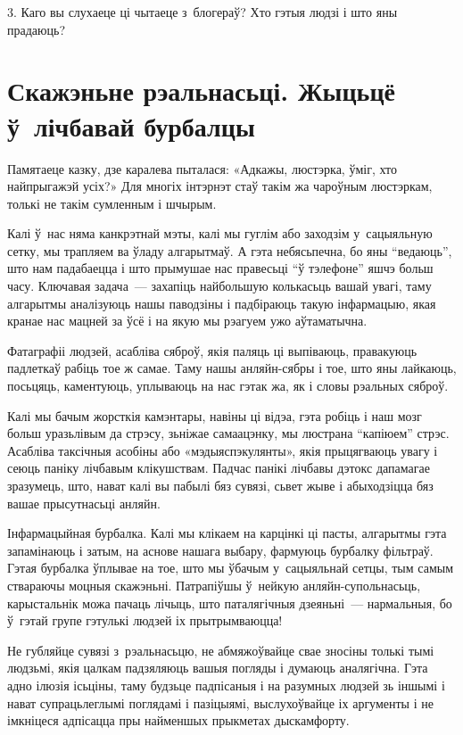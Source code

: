 3. Каго вы слухаеце ці чытаеце з~блогераў? Хто гэтыя людзі і што яны прадаюць?


\section{Скажэньне рэальнасьці. Жыцьцё ў~лічбавай бурбалцы}

Памятаеце казку, дзе каралева пыталася: «Адкажы, люстэрка, ўміг, хто найпрыгажэй усіх?» Для многіх інтэрнэт стаў такім жа чароўным люстэркам, толькі не такім сумленным і шчырым.

Калі ў~нас няма канкрэтнай мэты, калі мы гуглім або заходзім у~сацыяльную сетку, мы трапляем ва ўладу алгарытмаў. А гэта небясьпечна, бо яны ``ведаюць'', што нам падабаецца і што прымушае нас правесьці ``ў тэлефоне'' яшчэ больш часу. Ключавая задача~--- захапіць найбольшую колькасьць вашай увагі, таму алгарытмы аналізуюць нашы паводзіны і падбіраюць такую інфармацыю, якая кранае нас мацней за ўсё і на якую мы рэагуем ужо аўтаматычна.

Фатаграфіі людзей, асабліва сяброў, якія паляць ці выпіваюць, правакуюць падлеткаў рабіць тое ж самае. Таму нашы анляйн-сябры і тое, што яны лайкаюць, посьцяць, каментуюць, уплываюць на нас гэтак жа, як і словы рэальных сяброў.

Калі мы бачым жорсткія камэнтары, навіны ці відэа, гэта робіць і наш мозг больш уразьлівым да стрэсу, зьніжае самаацэнку, мы люстрана ``капіюем'' стрэс. Асабліва таксічныя асобіны або «мэдыяспэкулянты», якія прыцягваюць увагу і сеюць паніку лічбавым клікушствам. Падчас панікі лічбавы дэтокс дапамагае зразумець, што, нават калі вы пабылі бяз сувязі, сьвет жыве і абыходзіцца бяз вашае прысутнасьці анляйн.

Інфармацыйная бурбалка. Калі мы клікаем на карцінкі ці пасты, алгарытмы гэта запамінаюць і затым, на аснове нашага выбару, фармуюць бурбалку фільтраў. Гэтая бурбалка ўплывае на тое, што мы ўбачым у~сацыяльнай сетцы, тым самым ствараючы моцныя скажэньні. Патрапіўшы ў~нейкую анляйн-супольнасьць, карыстальнік можа пачаць лічыць, што паталягічныя дзеяньні~--- нармальныя, бо ў~гэтай групе гэтулькі людзей іх прытрымваюцца!

Не губляйце сувязі з~рэальнасьцю, не абмяжоўвайце свае зносіны толькі тымі людзьмі, якія цалкам падзяляюць вашыя погляды і думаюць аналягічна. Гэта адно ілюзія ісьціны, таму будзьце падпісаныя і на разумных людзей зь іншымі і нават супрацьлеглымі поглядамі і пазіцыямі, выслухоўвайце іх аргументы і не імкніцеся адпісацца пры найменшых прыкметах дыскамфорту.

